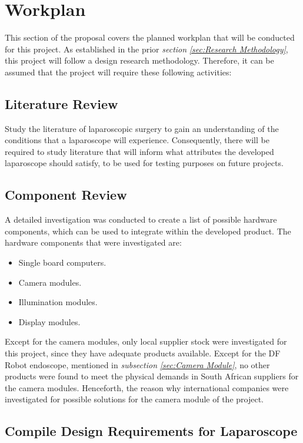 \section{Workplan}

This section of the proposal covers the planned workplan that will be conducted for this project. As established in the prior \textit{section} \textit{\ref{sec:Research Methodology}}, this project will follow a design research methodology. Therefore, it can be assumed that the project will require these following activities:

\subsection{Literature Review}

Study the literature of laparoscopic surgery to gain an understanding of the conditions that a laparoscope will experience. Consequently, there will be required to study literature that will inform what attributes the developed laparoscope should satisfy, to be used for testing purposes on future projects.

\subsection{Component Review}

A detailed investigation was conducted to create a list of possible hardware components, which can be used to integrate within the developed product. The hardware components that were investigated are:

\begin{itemize}
    \item Single board computers.
    \item Camera modules.
    \item Illumination modules.
    \item Display modules.
\end{itemize}

Except for the camera modules, only local supplier stock were investigated for this project, since they have adequate products available. Except for the DF Robot endoscope, mentioned in \textit{subsection} \textit{\ref{sec:Camera Module}}, no other products were found to meet the physical demands in South African suppliers for the camera modules. Henceforth, the reason why international companies were investigated for possible solutions for the camera module of the project. 

\subsection{Compile Design Requirements for Laparoscope}


